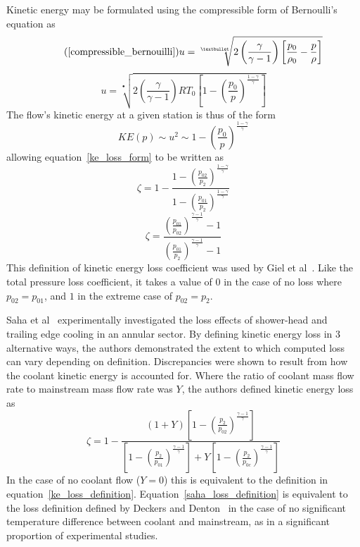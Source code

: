 \documentclass[a4paper, 11pt, oneside]{report}
\begin{document}
Kinetic energy may be formulated using the compressible form of Bernoulli's equation as
\begin{equation}\tag{\ref{compressible_bernouilli}}
u = 
\sqrt[•]{ 
2 \left( \frac{\gamma}{\gamma - 1} \right) \left[ \frac{p_0}{\rho_0} - \frac{p}{\rho} \right] 
}
\end{equation}
\begin{equation}
u =
\sqrt[•]{ 
	2 \left( \frac{\gamma}{\gamma - 1} \right)
	R T_0
	\left[
		1 - \left(
			\frac{p_0}{p}
		\right)
		^\frac{1-\gamma}{\gamma}
	\right] 
}
\end{equation}
The flow's kinetic energy at a given station is thus of the form
\begin{equation}
KE(p) 
\sim
u^2
\sim
1 - \left(
	\frac{p_0}{p}
\right)
^\frac{1-\gamma}{\gamma}
\end{equation}
allowing equation~\ref{ke_loss_form} to be written as
\begin{equation}
\zeta = 
1 - 
\frac{
	1 -
	\left(
		\frac{p_{02}}{p_2}
	\right)
	^\frac{1-\gamma}{\gamma}
}{
	1 -
	\left(
		\frac{p_{01}}{p_2}
	\right)
	^\frac{1-\gamma}{\gamma}
}
\end{equation}
\begin{equation}\label{ke_loss_definition}
\zeta = 
\frac{ 
	\left(
		\frac{p_{01}}{p_{02}}
	\right)
	^\frac{\gamma-1}{ \gamma } - 1 
}{
	\left(
	\frac{p_{01}}{p_{2}}
	\right)
	^\frac{\gamma-1}{ \gamma } - 1 
}
\end{equation}
This definition of kinetic energy loss coefficient was used by Giel et al~\cite{giel_te_thickness}. Like the total pressure loss coefficient, it takes a value of $0$ in the case of no loss where $p_{02} = p_{01}$, and $1$ in the extreme case of $p_{02} = p_2$.

Saha et al~\cite{saha_loss} experimentally investigated the loss effects of shower-head and trailing edge cooling in an annular sector. By defining kinetic energy loss in 3 alternative ways, the authors demonstrated the extent to which computed loss can vary depending on definition. Discrepancies were shown to result from how the coolant kinetic energy is accounted for. Where the ratio of coolant mass flow rate to mainstream mass flow rate was $Y$, the authors defined kinetic energy loss as
\begin{equation}\label{saha_loss_definition}
\zeta = 
1 -
\frac{ 
	\left( 1 + Y \right) 
	\left[
		1 -
		\left(
			\frac{p_2}{p_{02}}
		\right)
		^\frac{\gamma-1}{\gamma}
	\right]
}{
	\left[
		1 -
		\left(
			\frac{p_2}{p_{01}}
		\right)
		^\frac{\gamma-1}{\gamma}
	\right]
	+Y
	\left[
		1 -
		\left(
			\frac{p_2}{p_{0c}}
		\right)
		^\frac{\gamma-1}{\gamma}
	\right]
}
\end{equation}
In the case of no coolant flow ($Y=0$) this is equivalent to the definition in equation~\ref{ke_loss_definition}. Equation~\ref{saha_loss_definition} is equivalent to the loss definition defined by Deckers and Denton~\cite{deckers_loss} in the case of no significant temperature difference between coolant and mainstream, as in a significant proportion of experimental studies.
\end{document}
